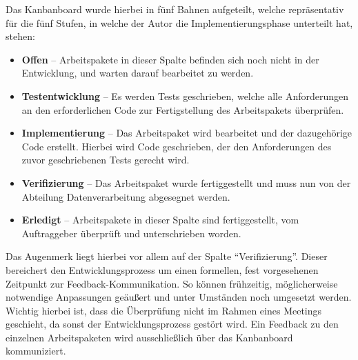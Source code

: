Das Kanbanboard wurde hierbei in fünf Bahnen aufgeteilt, welche repräsentativ für
die fünf Stufen, in welche der Autor die Implementierungsphase unterteilt hat, stehen:
\begin{itemize}
    \item \textbf{Offen} -- Arbeitspakete in dieser Spalte befinden sich noch
    nicht in der Entwicklung, und warten darauf bearbeitet zu werden.
    \item \textbf{Testentwicklung} -- Es werden Tests geschrieben, welche alle
    Anforderungen an den erforderlichen Code zur Fertigstellung des Arbeitspakets
    überprüfen.
    \item \textbf{Implementierung} -- Das Arbeitspaket wird bearbeitet und der dazugehörige Code erstellt. Hierbei wird Code geschrieben, der den Anforderungen
    des zuvor geschriebenen Tests gerecht wird.
    \item \textbf{Verifizierung} -- Das Arbeitspaket wurde fertiggestellt und
    muss nun von der Abteilung Datenverarbeitung abgesegnet werden.
    \item \textbf{Erledigt} -- Arbeitspakete in dieser Spalte sind fertiggestellt,
    vom Auftraggeber überprüft und unterschrieben worden.
\end{itemize}

Das Augenmerk liegt hierbei vor allem auf der Spalte "`Verifizierung"'.
Dieser bereichert den Entwicklungsprozess um einen formellen, fest vorgesehenen
Zeitpunkt zur Feedback-Kommunikation. So können frühzeitig, möglicherweise notwendige
Anpassungen geäußert und unter Umständen noch umgesetzt werden. Wichtig hierbei
ist, dass die Überprüfung nicht im Rahmen eines Meetings geschieht, da sonst der
Entwicklungsprozess gestört wird. Ein Feedback zu den einzelnen Arbeitspaketen
wird ausschließlich über das Kanbanboard kommuniziert.\par

